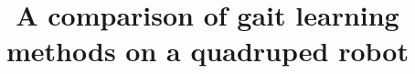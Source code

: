 \documentclass{sig-alternate}
\begin{document}
%

\title{A comparison of gait learning methods on a quadruped robot}
%
%
%
%
%

%
\end{document}
